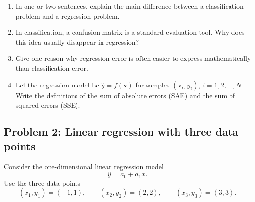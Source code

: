 \documentclass[12pt]{article}
\begin{document}
\begin{enumerate}
    \renewcommand{\labelenumi}{(\alph{enumi})}
    \item In one or two sentences, explain the main difference between a classification problem and a regression problem.

    \vspace{18pt}
    \fullunderline
    
    \vspace{18pt} 
    \fullunderline

    \item In classification, a confusion matrix is a standard evaluation tool. Why does this idea usually disappear in regression?

   \vspace{18pt}
    \fullunderline
    
    \vspace{18pt} 
    \fullunderline

    \item Give one reason why regression error is often easier to express mathematically than classification error.

   \vspace{18pt}
    \fullunderline
    
    \vspace{18pt} 
    \fullunderline

    \item Let the regression model be \(\hat{y} = f(\bm{x})\) for samples \((\bm{x}_i,y_i)\), \(i=1,2,\ldots,N\). Write the definitions of the sum of absolute errors (SAE) and the sum of squared errors (SSE).

   \vspace{18pt}
    \fullunderline
    
    \vspace{18pt} 
    \fullunderline
\end{enumerate}

\newpage 

\subsection*{Problem 2: Linear regression with three data points}
Consider the one-dimensional linear regression model
\[
\hat{y} = a_0 + a_1 x.
\]
Use the three data points
\[
(x_1,y_1)=(-1,1), \qquad (x_2,y_2)=(2,2), \qquad (x_3,y_3)=(3,3).
\]
\end{document}
